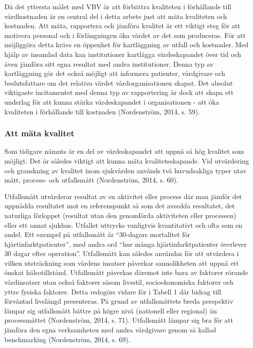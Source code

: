 Då det yttersta målet med VBV är att förbättra kvaliteten i förhållande till vårdkostnaden är en central del i detta arbete just att mäta kvaliteten och kostnaden. Att mäta, rapportera och jämföra kvalitet är ett viktigt steg för att motivera personal och i förlängningen öka värdet av det som produceras. För att möjliggöra detta krävs en öppenhet för kartläggning av utfall och kostnader. Med hjälp av insamlad data kan institutioner kartlägga värdeskapandet över tid och även jämföra sitt egna resultat med andra institutioner. Denna typ av kartläggning gör det också möjligt att informera patienter, vårdgivare och beslutsfattare om det relativa värdet vårdorganisationen skapat. Det absolut viktigaste incitamentet med denna typ av rapportering är dock att skapa ett underlag för att kunna stärka värdeskapandet i organisationen - att öka kvaliteten i förhållande till kostnaden (Nordenström, 2014, s. 59).

\subsubsection{Att mäta kvalitet}

Som tidigare nämnts är en del av värdeskapandet att uppnå så hög kvalitet som möjligt. Det är således viktigt att kunna mäta kvalitetsskapande. Vid utvärdering och granskning av kvalitet inom sjukvården används två huvudsakliga typer utav mått, process- och utfallsmått (Nordenström, 2014, s. 60).
 
Utfallsmått utvärderar resultat av en aktivitet eller process där man jämför det uppnådda resultatet mot en referenspunkt så som det avsedda resultatet, det naturliga förloppet (resultat utan den genomförda aktiviteten eller processen) eller ett annat sjukhus. Utfallet uttrycks vanligtvis kvantitativt och ofta som en andel. Ett exempel på utfallsmått är “30-dagars mortalitet för hjärtinfarktpatienter”, med andra ord “hur många hjärtinfarktpatienter överlever 30 dagar efter operation”. Utfallsmått kan således användas för att utvärdera i vilken utsträckning som vårdens insatser påverkar sannolikheten att uppnå ett önskat hälsotillstånd. Utfallsmått påverkas däremot inte bara av faktorer rörande vårdinsatser utan också faktorer såsom livsstil, socioekonomiska faktorer och yttre fysiska faktorer. Detta redogörs vidare för i Tabell 1 där bidrag till förväntad livslängd presenteras. På grund av utfallsmåttets breda perspektiv lämpar sig utfallsmått bättre på högre nivå (nationell eller regional) än processmåttet (Nordenström, 2014, s. 71). Utfallsmått  lämpar sig bra för att jämföra den egna verksamheten med andra vårdgivare genom så kallad benchmarking (Nordenström, 2014, s. 69).
 
